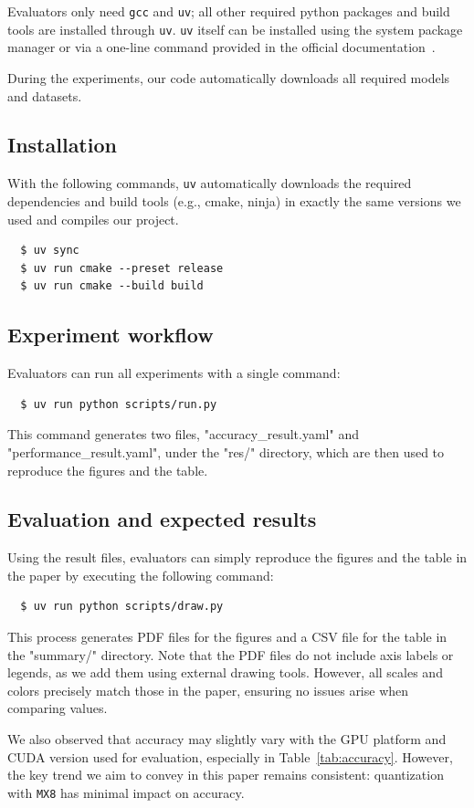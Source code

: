%
%
Evaluators only need \texttt{gcc} and \texttt{uv}; all other required
python packages and build tools are installed through \texttt{uv}.
%
\texttt{uv} itself can be installed using the system package manager
or via a one-line command provided in the official documentation~\cite{uv}.
%

%
%
During the experiments, our code automatically downloads all required
models and datasets.
%

\subsection{Installation}
%
With the following commands, \texttt{uv} automatically downloads the required
dependencies and build tools (e.g., cmake, ninja) in exactly the same
versions we used and compiles our project.
%
\begin{verbatim}
  $ uv sync
  $ uv run cmake --preset release
  $ uv run cmake --build build
\end{verbatim}

\subsection{Experiment workflow}
%
Evaluators can run all experiments with a single command:
%
\begin{verbatim}
  $ uv run python scripts/run.py
\end{verbatim}
%
This command generates two files, "accuracy\_result.yaml" and
"performance\_result.yaml", under the "res/" directory, which are
then used to reproduce the figures and the table.

\subsection{Evaluation and expected results}
%
Using the result files, evaluators can simply reproduce the figures
and the table in the paper by executing the following command:
%
\begin{verbatim}
  $ uv run python scripts/draw.py
\end{verbatim}
%
This process generates PDF files for the figures and a CSV file for
the table in the "summary/" directory.
%
Note that the PDF files do not include axis labels or legends, as we
add them using external drawing tools.
%
However, all scales and colors precisely match those in the paper,
ensuring no issues arise when
comparing values.
%

%
We also observed that accuracy may slightly vary with the GPU
platform and CUDA version used for evaluation, especially in
Table~\ref{tab:accuracy}.
%
However, the key trend we aim to convey in this paper remains
consistent: quantization with \texttt{MX8} has minimal impact on accuracy.
%
